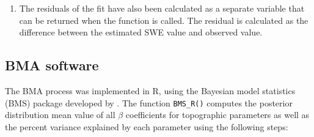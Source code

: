 \documentclass[12pt]{article}
\begin{document}
\begin{enumerate}
\item The residuals of the fit have also been calculated as a separate variable that can be returned when the function is called. The residual is calculated as the difference between the estimated SWE value and observed value. 
\end{enumerate}
	
	
	\subsection{BMA software}

The BMA process was implemented in R, using the Bayesian model statistics (BMS) package developed by \cite{Zeugner2015}. The function \texttt{BMS\_R()} computes the posterior distribution mean value of all $\beta$ coefficients for topographic parameters as well as the percent variance explained by each parameter using the following steps:
\end{document}
